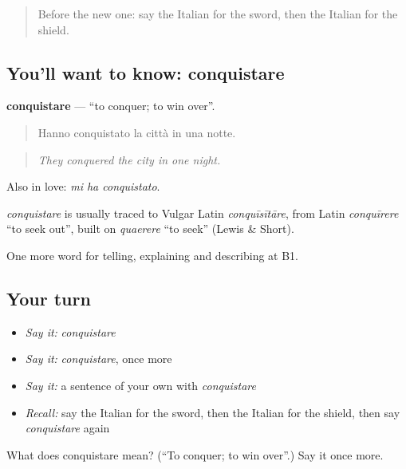 \begin{quote}
Before the new one: say the Italian for the sword, then the Italian for the shield.
\end{quote}

\subsection*{You'll want to know: conquistare}
\textbf{conquistare} — \textquotedblleft{}to conquer; to win over\textquotedblright{}.

\begin{quote}
Hanno conquistato la città in una notte.
\end{quote}

\begin{quote}
\emph{They conquered the city in one night.}
\end{quote}

Also in love: \emph{mi ha conquistato}.

\begin{cousinweb}
\emph{conquistare} is usually traced to Vulgar Latin \emph{conquīsītāre}, from Latin \emph{conquīrere} \textquotedblleft{}to seek out\textquotedblright{}, built on \emph{quaerere} \textquotedblleft{}to seek\textquotedblright{} (Lewis \& Short).
\end{cousinweb}

\begin{grammarlens}[title={What you've built}]
One more word for telling, explaining and describing at B1.
\end{grammarlens}

\subsection*{Your turn}
\begin{itemize}
\raggedright
  \item \emph{Say it:} \emph{conquistare}
  \item \emph{Say it:} \emph{conquistare}, once more
  \item \emph{Say it:} a sentence of your own with \emph{conquistare}
  \item \emph{Recall:} say the Italian for the sword, then the Italian for the shield, then say \emph{conquistare} again
\end{itemize}

\begin{tcolorbox}[breakable,colback=teal!4,colframe=teal!35!black,title={Before you move on}]
What does conquistare mean? (\textquotedblleft{}To conquer; to win over\textquotedblright{}.) Say it once more.
\end{tcolorbox}
